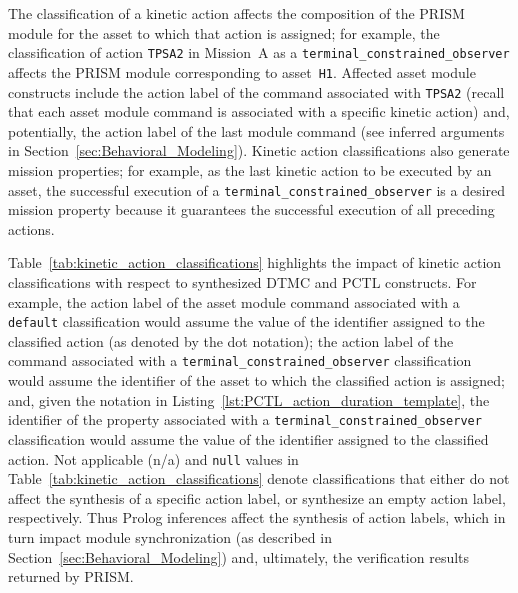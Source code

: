The classification of a kinetic action affects the composition of the PRISM module for the asset to which that action is assigned; for example, the classification of action \texttt{TPSA2} in Mission~A as a \texttt{terminal\_constrained\_observer} affects the PRISM module corresponding to asset~\texttt{H1}. Affected asset module constructs include the action label of the command associated with \texttt{TPSA2} (recall that each asset module command is associated with a specific kinetic action) and, potentially, the action label of the last module command (see inferred arguments in Section~\ref{sec:Behavioral_Modeling}). Kinetic action classifications also generate mission properties; for example, as the last kinetic action to be executed by an asset, the successful execution of a \texttt{terminal\_constrained\_observer} is a desired mission property because it guarantees the successful execution of all preceding actions.

Table~\ref{tab:kinetic_action_classifications} highlights the impact of kinetic action classifications with respect to synthesized DTMC and PCTL constructs. For example, the action label of the asset module command associated with a \texttt{default} classification would assume the value of the identifier assigned to the classified action (as denoted by the dot notation); the action label of the command associated with a \texttt{terminal\_constrained\_observer} classification would assume the identifier of the asset to which the classified action is assigned; and, given the notation in Listing~\ref{lst:PCTL_action_duration_template}, the identifier of the property associated with a \texttt{terminal\_constrained\_observer} classification would assume the value of the identifier assigned to the classified action. Not applicable (n/a) and \texttt{null} values in Table~\ref{tab:kinetic_action_classifications} denote classifications that either do not affect the synthesis of a specific action label, or synthesize an empty action label, respectively. Thus Prolog inferences affect the synthesis of action labels, which in turn impact module synchronization (as described in Section~\ref{sec:Behavioral_Modeling}) and, ultimately, the verification results returned by PRISM\@.

